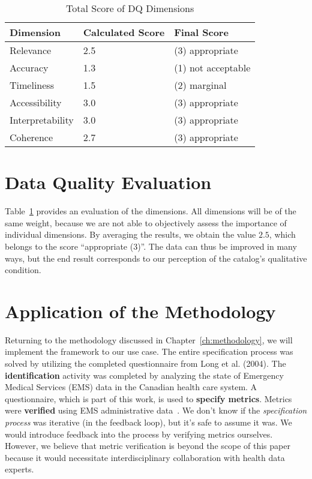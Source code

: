 \begin{table}[htbp]
    \centering

    \begin{tabular}{lll}
        \toprule
        Dimension           & Calculated Score  & Final Score           \\ \midrule
        Relevance           & 2.5               & (3) appropriate       \\
        Accuracy            & 1.3               & (1) not acceptable    \\
        Timeliness          & 1.5               & (2) marginal          \\
        Accessibility       & 3.0               & (3) appropriate       \\
        Interpretability    & 3.0               & (3) appropriate       \\
        Coherence           & 2.7               & (3) appropriate       \\
            
        \bottomrule
    \end{tabular}

    \caption{Total Score of DQ Dimensions}
    \label{table:dimensions-score}
\end{table}
\FloatBarrier

\section{Data Quality Evaluation}

Table~\ref{table:dimensions-score} provides an evaluation of the dimensions.
All dimensions will be of the same weight, because we are not able to objectively assess the importance of individual dimensions.
By averaging the results, we obtain the value \( 2.5 \), which belongs to the score \enquote{appropriate (3)}.
The data can thus be improved in many ways, but the end result corresponds to our perception of the catalog's qualitative condition.

\section{Application of the Methodology}

Returning to the methodology discussed in Chapter~\ref{ch:methodology}, we will implement the framework to our use case.
The entire specification process was solved by utilizing the completed questionnaire from Long et al. (2004).
The \textbf{identification} activity was completed by analyzing the state of Emergency Medical Services (EMS) data in the Canadian health care system.
A questionnaire, which is part of this work, is used to \textbf{specify metrics}.
Metrics were \textbf{verified} using EMS administrative data~\cite{long2004}.
We don't know if the \textit{specification process} was iterative (in the feedback loop), but it's safe to assume it was.
We would introduce feedback into the process by verifying metrics ourselves.
However, we believe that metric verification is beyond the scope of this paper because it would necessitate interdisciplinary collaboration with health data experts.

